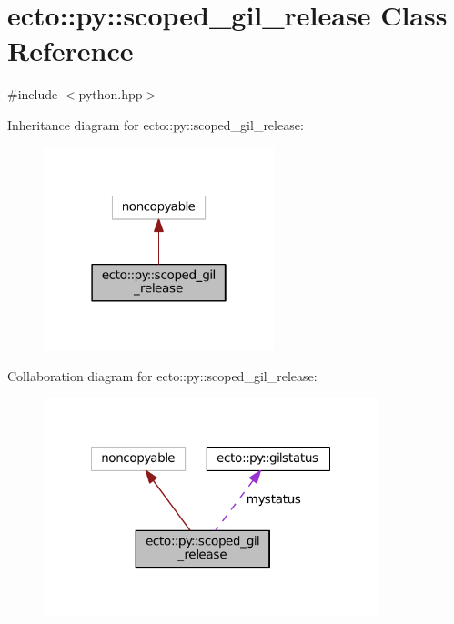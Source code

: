 \hypertarget{classecto_1_1py_1_1scoped__gil__release}{\section{ecto\-:\-:py\-:\-:scoped\-\_\-gil\-\_\-release Class Reference}
\label{classecto_1_1py_1_1scoped__gil__release}
}


{\ttfamily \#include $<$python.\-hpp$>$}



Inheritance diagram for ecto\-:\-:py\-:\-:scoped\-\_\-gil\-\_\-release\-:\nopagebreak
\begin{figure}[H]
\begin{center}
\leavevmode
\includegraphics[width=190pt]{classecto_1_1py_1_1scoped__gil__release__inherit__graph}
\end{center}
\end{figure}


Collaboration diagram for ecto\-:\-:py\-:\-:scoped\-\_\-gil\-\_\-release\-:\nopagebreak
\begin{figure}[H]
\begin{center}
\leavevmode
\includegraphics[width=275pt]{classecto_1_1py_1_1scoped__gil__release__coll__graph}
\end{center}
\end{figure}
